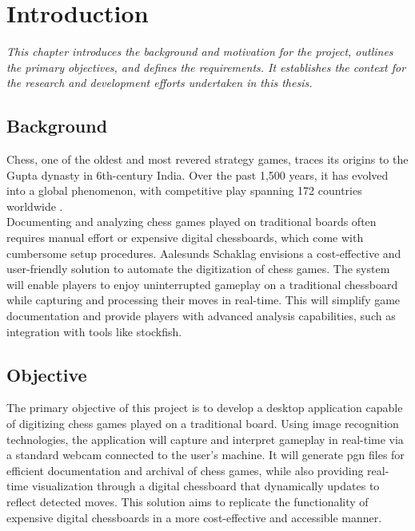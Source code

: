 \chapter{Introduction}

\begin{center} \textit{This chapter introduces the background and motivation for the project, outlines the primary objectives, and defines the requirements. It establishes the context for the research and development efforts undertaken in this thesis.}
\end{center}

\section{Background}

Chess, one of the oldest and most revered strategy games, traces its origins to the Gupta dynasty in 6th-century India. Over the past 1,500 years, it has evolved into a global phenomenon, with competitive play spanning 172 countries worldwide \cite{artsnculture}. \\

Documenting and analyzing chess games played on traditional boards often requires manual effort or expensive digital chessboards, which come with cumbersome setup procedures. Aalesunds Schaklag envisions a cost-effective and user-friendly solution to automate the digitization of chess games.  The system will enable players to enjoy uninterrupted gameplay on a traditional chessboard while capturing and processing their moves in real-time. This will simplify game documentation and provide players with advanced analysis capabilities, such as integration with tools like \gls{stockfish}.

\section{Objective}

The primary objective of this project is to develop a desktop application capable of digitizing chess games played on a traditional board. Using image recognition technologies, the application will capture and interpret gameplay in real-time via a standard webcam connected to the user's machine. It will generate \gls{pgn} files for efficient documentation and archival of chess games, while also providing real-time visualization through a digital chessboard that dynamically updates to reflect detected moves. This solution aims to replicate the functionality of expensive digital chessboards in a more cost-effective and accessible manner.


